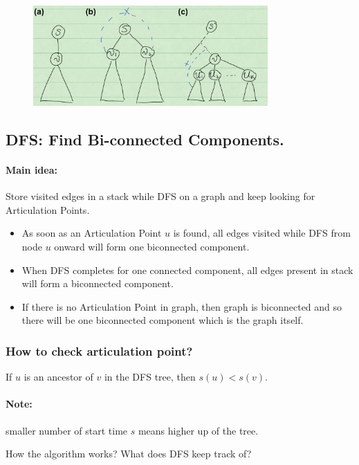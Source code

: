 \begin{figure}[H]
\centering
\includegraphics[width=0.8\textwidth]{find-articulation.png}
\end{figure}

\subsection{DFS: Find Bi-connected Components.}
\paragraph{Main idea:} Store visited edges in a stack while DFS on a graph and keep looking for Articulation Points. 
\begin{itemize}
 \item As soon as an Articulation Point $u$ is found, all edges visited while DFS from node $u$ onward will form one biconnected component. 
 \item When DFS completes for one connected component, all edges present in stack will form a biconnected component.
 \item If there is no Articulation Point in graph, then graph is biconnected and so there will be one biconnected component which is the graph itself.
\end{itemize}

\subsubsection{How to check articulation point?}
\begin{claim}
 If $u$ is an ancestor of $v$ in the DFS tree, then $s(u) < s(v)$.
\end{claim}
\paragraph{Note:} smaller number of start time $s$ means higher up of the tree. 

How the algorithm works? What does DFS keep track of? 


